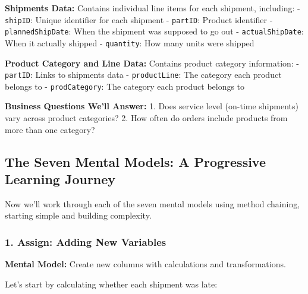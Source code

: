 \documentclass[
  letterpaper,
  DIV=11,
  numbers=noendperiod]{scrartcl}
\begin{document}
\begin{tcolorbox}[enhanced jigsaw, toptitle=1mm, opacityback=0, colframe=quarto-callout-note-color-frame, leftrule=.75mm, arc=.35mm, opacitybacktitle=0.6, breakable, titlerule=0mm, coltitle=black, bottomtitle=1mm, title=\textcolor{quarto-callout-note-color}{\faInfo}\hspace{0.5em}{💡 Understanding the Data}, colbacktitle=quarto-callout-note-color!10!white, rightrule=.15mm, left=2mm, bottomrule=.15mm, toprule=.15mm, colback=white]

\textbf{Shipments Data:} Contains individual line items for each
shipment, including: - \texttt{shipID}: Unique identifier for each
shipment - \texttt{partID}: Product identifier -
\texttt{plannedShipDate}: When the shipment was supposed to go out -
\texttt{actualShipDate}: When it actually shipped - \texttt{quantity}:
How many units were shipped

\textbf{Product Category and Line Data:} Contains product category
information: - \texttt{partID}: Links to shipments data -
\texttt{productLine}: The category each product belongs to -
\texttt{prodCategory}: The category each product belongs to

\textbf{Business Questions We'll Answer:} 1. Does service level (on-time
shipments) vary across product categories? 2. How often do orders
include products from more than one category?

\end{tcolorbox}

\subsection{The Seven Mental Models: A Progressive Learning
Journey}\label{the-seven-mental-models-a-progressive-learning-journey}

Now we'll work through each of the seven mental models using method
chaining, starting simple and building complexity.

\subsubsection{1. Assign: Adding New
Variables}\label{assign-adding-new-variables}

\textbf{Mental Model:} Create new columns with calculations and
transformations.

Let's start by calculating whether each shipment was late:
\end{document}
